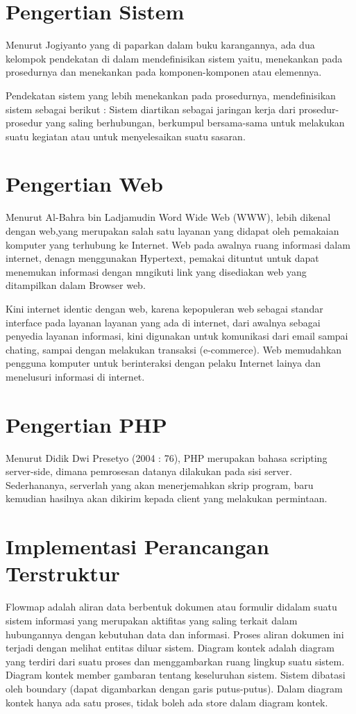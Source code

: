 \documentclass{jtetiproposalskripsi}
\begin{document}
\section{Pengertian Sistem}
Menurut Jogiyanto yang di paparkan dalam buku karangannya, ada dua kelompok pendekatan di dalam mendefinisikan sistem yaitu, menekankan pada prosedurnya dan menekankan pada komponen-komponen atau elemennya. 

Pendekatan sistem yang lebih menekankan pada prosedurnya, mendefinisikan sistem sebagai berikut :
Sistem diartikan sebagai jaringan kerja dari prosedur-prosedur yang saling berhubungan, berkumpul bersama-sama untuk melakukan suatu kegiatan atau untuk menyelesaikan suatu sasaran.

\section{Pengertian Web}
Menurut Al-Bahra bin Ladjamudin Word Wide Web (WWW), lebih dikenal dengan web,yang merupakan salah satu layanan yang didapat oleh pemakaian komputer yang terhubung ke Internet. Web pada awalnya ruang informasi dalam internet, denagn menggunakan Hypertext, pemakai dituntut untuk dapat menemukan informasi dengan mngikuti link yang disediakan web yang ditampilkan dalam Browser web.

Kini internet identic dengan web, karena kepopuleran web sebagai standar interface pada layanan  layanan yang ada di internet, dari awalnya sebagai penyedia layanan informasi, kini digunakan untuk komunikasi dari email sampai chating, sampai dengan melakukan transaksi (e-commerce). Web memudahkan pengguna komputer untuk berinteraksi dengan pelaku Internet lainya dan menelusuri informasi di internet.

\section{Pengertian PHP}
Menurut Didik Dwi Presetyo (2004 : 76), PHP merupakan bahasa 
scripting server-side, dimana pemrosesan datanya dilakukan pada sisi server. 
Sederhananya, serverlah yang akan menerjemahkan skrip program, baru 
kemudian hasilnya akan dikirim kepada client yang melakukan permintaan.

\section{Implementasi Perancangan Terstruktur}
Flowmap adalah aliran data berbentuk dokumen atau formulir didalam suatu sistem informasi yang merupakan aktifitas yang saling terkait dalam hubungannya dengan kebutuhan data dan informasi. Proses aliran dokumen ini terjadi dengan melihat entitas diluar sistem.
Diagram kontek adalah diagram yang terdiri dari suatu proses dan menggambarkan ruang lingkup suatu sistem. Diagram kontek member gambaran tentang keseluruhan sistem. Sistem dibatasi oleh boundary (dapat digambarkan dengan garis putus-putus). Dalam diagram kontek hanya ada satu proses, tidak boleh ada store dalam diagram kontek.
\end{document}
